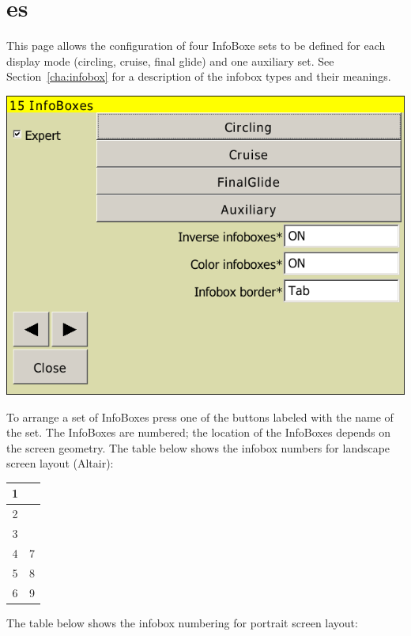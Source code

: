 \documentclass[a4paper,12pt]{refrep}
\begin{document}

\clearpage
\section{{\InfoBox}es}

This page allows the configuration of four InfoBoxe sets to be defined for each
display mode (circling, cruise, final glide) and one auxiliary set.  See
Section~\ref{cha:infobox} for a description of the infobox types and their meanings.

\begin{center}
\includegraphics[angle=0,width=\linewidth,keepaspectratio='true']{figures/config-infoboxes.png}
\end{center}

To arrange a set of InfoBoxes press one of the buttons labeled with the name
of the set.  The InfoBoxes are numbered; the location of the InfoBoxes depends
on the screen geometry.  The table below shows the infobox numbers for landscape screen layout (Altair):

\begin{tabular}{|c|c|}
\hline
1 &  \\
\hline
2 &  \\
\hline
3 &  \\
\hline
4 & 7 \\
\hline
5 & 8 \\
\hline
6 & 9 \\
\hline
\end{tabular}

The table below shows the infobox numbering for portrait screen layout:
\end{document}
